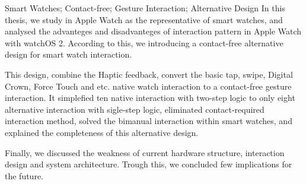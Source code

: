 
\begin{abstract}{智能手表；非接触式；手势交互；备择设计}
本文以现有智能手表产品的代表 Apple Watch 为例，对 Apple Watch 上的交互模式的优缺点进行了全面的分析，并据此给出了一套非接触式的备择设计。其配合了 Haptic Engine 对用户的直观震动反馈，完成了对基础点按、滑动、Digital Crown、Force Touch等系列原生交互的非接触式手势交互设计，此设计将嵌套两步逻辑的十种原生交互简化为了单步逻辑上的八种备择交互，且消除了接触式交互的依赖，解决了现有交互中对双手依赖的缺陷，并同时说明了给出的备择设计的交互完备性。最后，本文对设计的硬件结构、交互方式和系统架构的现有缺陷进行了讨论，并从中得到的启示，给出了可行的解决思路。
\end{abstract}

\begin{abstractEng}{Smart Watches; Contact-free; Gesture Interaction; Alternative Design}
In this thesis, we study in Apple Watch as the representative of smart watches, and analysed the advanteges and disadvanteges of interaction pattern in Apple Watch with watchOS 2. According to this, we introducing a contact-free alternative design for smart watch interaction.

This design, combine the Haptic feedback, convert the basic tap, swipe, Digital Crown, Force Touch and etc. native watch interaction to a contact-free gesture interaction. It simplefied ten native interaction with two-step logic to only eight alternative interaction with sigle-step logic, eliminated contact-required interaction method, solved the bimanual interaction within smart watches, and explained the completeness of this alternative design.

Finally, we discussed the weakness of current hardware structure, interaction design and system architecture. Trough this, we concluded few implications for the future.
\end{abstractEng}
